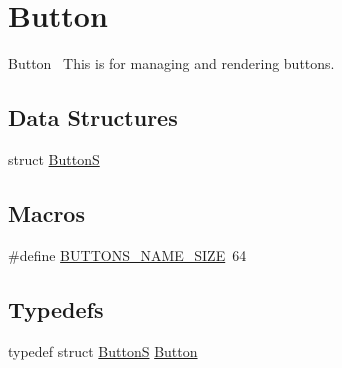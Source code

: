 \hypertarget{group___button}{}\section{Button}
\label{group___button}


Button~\newline
This is for managing and rendering buttons.  


\subsection*{Data Structures}
\begin{DoxyCompactItemize}
\item 
struct \hyperlink{struct_button_s}{ButtonS}
\end{DoxyCompactItemize}
\subsection*{Macros}
\begin{DoxyCompactItemize}
\item 
\#define \hyperlink{group___button_ga5a86b4b0ec8a21993f74ae423ec74538}{B\+U\+T\+T\+O\+N\+S\+\_\+\+N\+A\+M\+E\+\_\+\+S\+I\+ZE}~64
\end{DoxyCompactItemize}
\subsection*{Typedefs}
\begin{DoxyCompactItemize}
\item 
typedef struct \hyperlink{struct_button_s}{ButtonS} \hyperlink{group___button_ga8eb77e296d5ad4c7931e19ecf7256053}{Button}
\end{DoxyCompactItemize}
